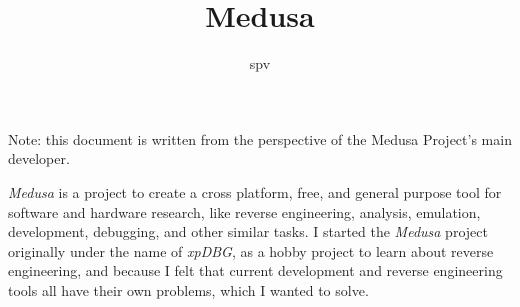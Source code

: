 \documentclass{article}
\title{Medusa}
\author{spv}
\begin{document}
	\maketitle

    Note: this document is written from the perspective of the Medusa Project's
    main developer.

	\textit{Medusa} is a project to create a cross platform, free, and general
    purpose tool for software and hardware research, like reverse engineering,
    analysis, emulation, development, debugging, and other similar tasks. I
    started the \textit{Medusa} project originally under the name of
    \textit{xpDBG}, as a hobby project to learn about reverse engineering, and
    because I felt that current development and reverse engineering tools all
    have their own problems, which I wanted to solve.
\end{document}
